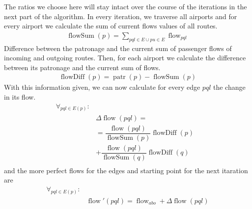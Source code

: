 \documentclass[twocolumn]{tum-article}
\DeclareMathOperator{\patronage}{patr}
\DeclareMathOperator{\flow}{flow}
\DeclareMathOperator{\flowSum}{flowSum}
\DeclareMathOperator{\flowDiff}{flowDiff}
\begin{document}
The ratios we choose here will stay intact over the course of the iterations in the next part of the algorithm.
In every iteration, we traverse all airports and for every airport we calculate the sum of current flows values of all routes. 
\begin{equation}
\begin{aligned}
\flowSum(p) = \displaystyle\sum_{pql \in E \cup pu \in E}\flow_{pql}
\end{aligned}
\end{equation}
Difference between the patronage and the current sum of passenger flows of incoming and outgoing routes. 
Then, for each airport we calculate the difference between its patronage and the current sum of flows.
\begin{equation}
\begin{aligned}
\flowDiff(p) = \patronage(p) - \flowSum(p) 
\end{aligned}
\end{equation}
With this information given, we can now calculate for every edge $pql$ the change in its flow. 
\begin{equation}
\begin{aligned}
\forall_{pql \in E(p)}: & \\
& \Delta \flow(pql) = & \\ 
& ={} \dfrac{\flow(pql)}{\flowSum(p)}\flowDiff(p) \\
& +{} \dfrac{\flow(pql)}{\flowSum(q)}\flowDiff(q) \\
\end{aligned}
\end{equation}
and the more perfect flows for the edges and starting point for the next itaration are
\begin{equation}
\begin{aligned}
\forall_{pql \in E(p)}: & \\
& \flow'(pql) = \flow_{abo} + \Delta \flow(pql)
\end{aligned}
\end{equation}
\end{document}
